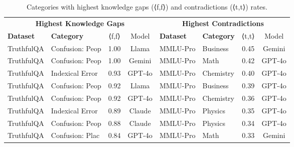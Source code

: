 \begin{table}[htbp]
\centering
\caption{Categories with highest knowledge gaps (⟨f,f⟩) and contradictions (⟨t,t⟩) rates.}
\begin{tabular}{ll|cc|ll|cc}
\toprule
\multicolumn{4}{c|}{\textbf{Highest Knowledge Gaps}} & \multicolumn{4}{c}{\textbf{Highest Contradictions}} \\
\textbf{Dataset} & \textbf{Category} & ⟨f,f⟩ & Model & \textbf{Dataset} & \textbf{Category} & ⟨t,t⟩ & Model \\
\midrule
TruthfulQA & Confusion: Peop & 1.00 & Llama & MMLU-Pro & Business & 0.45 & Gemini \\
TruthfulQA & Confusion: Peop & 1.00 & Gemini & MMLU-Pro & Math & 0.42 & GPT-4o \\
TruthfulQA & Indexical Error & 0.93 & GPT-4o & MMLU-Pro & Chemistry & 0.40 & GPT-4o \\
TruthfulQA & Confusion: Peop & 0.92 & Llama & MMLU-Pro & Business & 0.39 & GPT-4o \\
TruthfulQA & Confusion: Peop & 0.92 & GPT-4o & MMLU-Pro & Chemistry & 0.36 & GPT-4o \\
TruthfulQA & Indexical Error & 0.89 & Claude & MMLU-Pro & Physics & 0.35 & GPT-4o \\
TruthfulQA & Confusion: Peop & 0.88 & Claude & MMLU-Pro & Physics & 0.34 & GPT-4o \\
TruthfulQA & Confusion: Plac & 0.84 & GPT-4o & MMLU-Pro & Math & 0.33 & Gemini \\
\bottomrule
\end{tabular}
\end{table}

